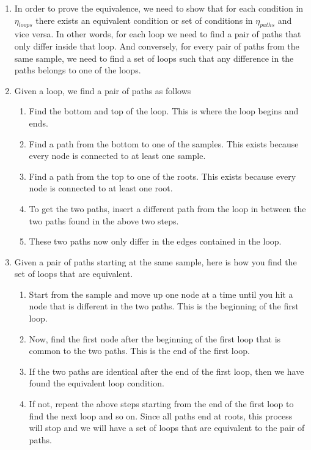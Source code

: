 \begin{enumerate}
    \item In order to prove the equivalence, we need to show that for each condition in $\eta_{loops}$ there exists an equivalent condition or set of conditions in $\eta_{paths}$ and vice versa. In other words, for each loop we need to find a pair of paths that only differ inside that loop. And conversely, for every pair of paths from the same sample, we need to find a set of loops such that any difference in the paths belongs to one of the loops. 
    \item Given a loop, we find a pair of paths as follows
    \begin{enumerate}
        \item Find the bottom and top of the loop. This is where the loop begins and ends. 
        \item Find a path from the bottom to one of the samples. This exists because every node is connected to at least one sample.
        \item Find a path from the top to one of the roots. This exists because every node is connected to at least one root. 
        \item To get the two paths, insert a different path from the loop in between the two paths found in the above two steps. 
        \item These two paths now only differ in the edges contained in the loop.
    \end{enumerate}
    \item Given a pair of paths starting at the same sample, here is how you find the set of loops that are equivalent.
    \begin{enumerate}
        \item Start from the sample and move up one node at a time until you hit a node that is different in the two paths. This is the beginning of the first loop.
        \item Now, find the first node after the beginning of the first loop that is common to the two paths. This is the end of the first loop.
        \item If the two paths are identical after the end of the first loop, then we have found the equivalent loop condition. 
        \item If not, repeat the above steps starting from the end of the first loop to find the next loop and so on. Since all paths end at roots, this process will stop and we will have a set of loops that are equivalent to the pair of paths. 
    \end{enumerate}
    
\end{enumerate}



